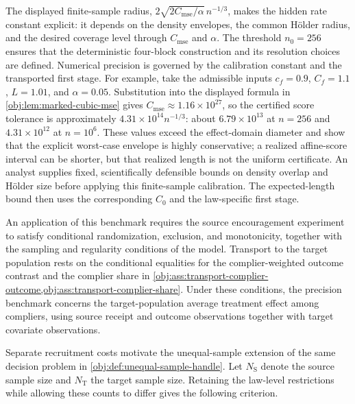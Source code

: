 The displayed finite-sample radius, \(2\sqrt{2C_{\mathrm{mse}}/\alpha}\,n^{-1/3}\), makes the hidden rate constant explicit: it depends on the density envelopes, the common H\"older radius, and the desired coverage level through \(C_{\mathrm{mse}}\) and \(\alpha\). The threshold \(n_0=256\) ensures that the deterministic four-block construction and its resolution choices are defined. Numerical precision is governed by the calibration constant and the transported first stage. For example, take the admissible inputs \(c_f=0.9\), \(C_f=1.1\), \(L=1.01\), and \(\alpha=0.05\). Substitution into the displayed formula in \cref{obj:lem:marked-cubic-mse} gives \(C_{\mathrm{mse}}\approx1.16\times10^{27}\), so the certified score tolerance is approximately \(4.31\times10^{14}n^{-1/3}\): about \(6.79\times10^{13}\) at \(n=256\) and \(4.31\times10^{12}\) at \(n=10^6\). These values exceed the effect-domain diameter and show that the explicit worst-case envelope is highly conservative; a realized affine-score interval can be shorter, but that realized length is not the uniform certificate. An analyst supplies fixed, scientifically defensible bounds on density overlap and Hölder size before applying this finite-sample calibration. The expected-length bound then uses the corresponding \(C_0\) and the law-specific first stage.

An application of this benchmark requires the source encouragement experiment to satisfy conditional randomization, exclusion, and monotonicity, together with the sampling and regularity conditions of the model. Transport to the target population rests on the conditional equalities for the complier-weighted outcome contrast and the complier share in \cref{obj:ass:transport-complier-outcome,obj:ass:transport-complier-share}. Under these conditions, the precision benchmark concerns the target-population average treatment effect among compliers, using source receipt and outcome observations together with target covariate observations.

Separate recruitment costs motivate the unequal-sample extension of the same decision problem in \cref{obj:def:unequal-sample-handle}. Let \(N_{\mathrm S}\) denote the source sample size and \(N_{\mathrm T}\) the target sample size. Retaining the law-level restrictions while allowing these counts to differ gives the following criterion.

